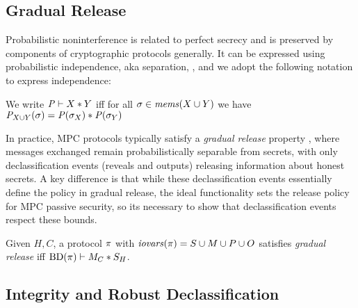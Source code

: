 \subsection{Gradual Release}

Probabilistic noninterference is related to perfect secrecy and is
preserved by components of cryptographic protocols generally. It can
be expressed using probabilistic independence, aka separation,
\cite{darais2019language,barthe2019probabilistic}, and we adopt the
following notation to express independence:
\begin{definition}
  We write $\mathit{P} \vdash X * Y$ iff for all
    $\sigma \in \mathit{mems}(X \cup Y)$ we have
  ${\mathit{P}}_{X \cup Y}(\sigma) =
  \mathit{P}(\sigma_X) * \mathit{P}(\sigma_Y)$
\end{definition}

In practice, MPC protocols typically satisfy a \emph{gradual
release} property \cite{sabelfeld2009declassification}, where messages
exchanged remain probabilistically separable from secrets, with only
declassification events (reveals and outputs) releasing information
about honest secrets.  A key difference is that while these
declassification events essentially define the policy in gradual
release, the ideal functionality sets the release policy for MPC
passive security, so its necessary to show that declassification
events respect these bounds.
\begin{definition}
  Given $H,C$, a protocol $\pi$ with $\mathit{iovars}(\pi) = S \cup M \cup P \cup O$
  satisfies \emph{gradual release} iff
  $\mathrm{BD}(\pi) \vdash M_C * S_H$.
\end{definition}

\subsection{Integrity and Robust Declassification}


